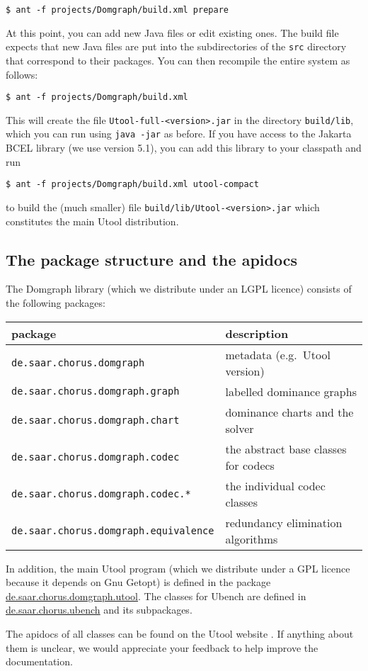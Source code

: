 \begin{verbatim}
$ ant -f projects/Domgraph/build.xml prepare
\end{verbatim}

At this point, you can add new Java files or edit existing ones. The
build file expects that new Java files are put into the subdirectories
of the \verb?src? directory that correspond to their packages. You can
then recompile the entire system as follows:

\begin{verbatim}
$ ant -f projects/Domgraph/build.xml 
\end{verbatim}

This will create the file \verb?Utool-full-<version>.jar? in the
directory \verb?build/lib?, which you can run using \verb?java -jar?
as before. If you have access to the Jakarta BCEL library (we use
version 5.1), you can add this library to your classpath and run

\begin{verbatim}
$ ant -f projects/Domgraph/build.xml utool-compact
\end{verbatim}

to build the (much smaller) file \verb?build/lib/Utool-<version>.jar?
which constitutes the main Utool distribution.




\subsection{The package structure and the apidocs}

The Domgraph library (which we distribute under an LGPL licence)
consists of the following packages:

\begin{tabular}{l|l}
package & description \\\hline
\verb?de.saar.chorus.domgraph? & metadata (e.g.\ Utool version) \\
\verb?de.saar.chorus.domgraph.graph? & labelled dominance graphs \\
\verb?de.saar.chorus.domgraph.chart? & dominance charts and the solver
\\
\verb?de.saar.chorus.domgraph.codec? & the abstract base classes for
codecs \\
\verb?de.saar.chorus.domgraph.codec.*? & the individual codec classes
\\
\verb?de.saar.chorus.domgraph.equivalence? & redundancy elimination
algorithms
\end{tabular}

In addition, the main Utool program (which we distribute under a GPL
licence because it depends on Gnu Getopt) is defined in the package
\url{de.saar.chorus.domgraph.utool}. The classes for Ubench
 are defined in \url{de.saar.chorus.ubench} and its
subpackages.

The apidocs of all classes can be found on the Utool website
. If anything about them is unclear, we would appreciate
your feedback to help improve the documentation.






